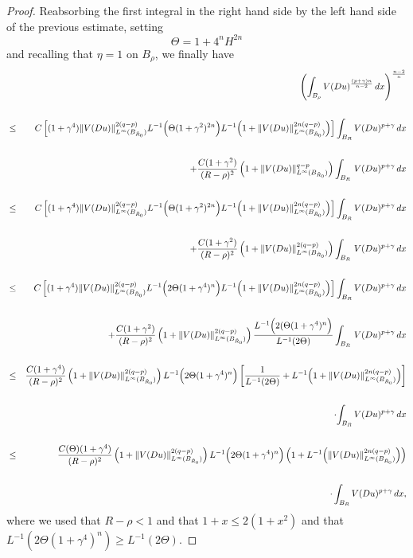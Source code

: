 \documentclass[12pt]{amsart}
\theoremstyle{definition}
\numberwithin{equation}{section}
\numberwithin{equation}{section}
\begin{document}
{\begin{proof}
Reabsorbing the first integral in the right hand side by the left hand side {of the previous estimate}, setting
$$\Theta= {1 + 4^nH^{2n}}$$
and recalling that $\eta=1$ on $B_\rho$, we finally have
\begin{eqnarray}\label{baseiter}
&&\left (\int_{B_{\rho}} V(Du)^{\frac{(p + \gamma) n}{n-2}} \,dx \right )^{\frac{n-2}{n}} \cr\cr
&\le& C\left[(1+\gamma^4) \|V(Du)\|_{L^\infty(B_{\tilde R_0})}^{2(q-p)} {{L}}^{-1} \Big(\Theta (1+\gamma^2)^{2n}\Big){{L}}^{-1} \Big(1+\|V(Du)\|^{2n(q-p)}_{L^\infty(B_{ \tilde R_0})}\Big) 
\right] \int_{B_R} V(Du)^{p + \gamma} \, dx\cr\cr
&&\qquad+\frac{C(1+\gamma^2)}{(R - \rho)^{2}}  \left(1 + \|V(Du)\|_{L^\infty(B_{\tilde R_0})}^{q-p} \right) \int_{B_{R}}  \,  V(Du)^{p + \gamma}  \, dx
\cr\cr
&\le& {C\left[(1+\gamma^4) \|V(Du)\|_{L^\infty(B_{\tilde R_0})}^{2(q-p)} {{L}}^{-1} \Big(\Theta (1+\gamma^2)^{2n}\Big){{L}}^{-1} \Big(1+\|V(Du)\|^{2n(q-p)}_{L^\infty(B_{ \tilde R_0})}\Big) 
\right] \int_{B_R} V(Du)^{p + \gamma} \, dx}\cr\cr
&&\qquad {+\frac{C(1+\gamma^2)}{(R - \rho)^{2}}  \left(1 + \|V(Du)\|_{L^\infty(B_{\tilde R_0})}^{2(q-p)} \right) \int_{B_{R}}  \,  V(Du)^{p + \gamma}  \, dx}
\cr\cr
&\le& {C\left[(1+\gamma^4) \|V(Du)\|_{L^\infty(B_{\tilde R_0})}^{2(q-p)} {{L}}^{-1} \Big({2} \Theta (1+\gamma^4)^{n}\Big){{L}}^{-1} \Big(1+\|V(Du)\|^{2n(q-p)}_{L^\infty(B_{ \tilde R_0})}\Big) 
\right] \int_{B_R} V(Du)^{p + \gamma} \, dx}\cr\cr
&&\qquad {+\frac{C(1+\gamma^2)}{(R - \rho)^{2}}  \left(1 + \|V(Du)\|_{L^\infty(B_{\tilde R_0})}^{2(q-p)} \right) \frac{L^{-1} \Big({2} (\Theta (1 + \gamma^4)^n \Big)}{L^{-1}({2} \Theta)}
\int_{B_{R}}  \,  V(Du)^{p + \gamma}  \, dx}
\cr\cr
&\le& 
{{\frac{C(1+\gamma^4)}{(R - \rho)^{2}}\left(1 + \|V(Du)\|_{L^\infty(B_{\tilde R_0})}^{2(q-p)} \right){{L}}^{-1} \Big({2}\Theta (1+\gamma^4)^n\Big) \left [\frac{1}{L^{-1}(2 \Theta)}+{{L}}^{-1} \Big(1+\|V(Du)\|^{2n(q-p)}_{L^\infty(B_{ \tilde R_0})}\Big)\right ]}}\cr\cr
&&\qquad\qquad\qquad\cdot {\int_{B_R} V(Du)^{p + \gamma} \, dx} \cr\cr
&\le& 
{\frac{{C(\Theta)}(1+\gamma^4)}{(R - \rho)^{2}}\left(1 + \|V(Du)\|_{L^\infty(B_{\tilde R_0})}^{2(q-p)} \right){{L}}^{-1} \Big({2}\Theta (1+\gamma^4)^n\Big) \left(1+{{L}}^{-1} \Big(\|V(Du)\|^{2n(q-p)}_{L^\infty(B_{ \tilde R_0})}\Big)\right)}\cr\cr
&&\qquad\qquad\qquad\qquad\qquad\cdot\int_{B_R} V(Du)^{p + \gamma} \, dx,
\end{eqnarray}
{where we used that $R-\rho<1$ and that $1+x\le 2(1+x^2)$ and that $L^{-1}({2}\Theta (1+\gamma^4)^n)\ge L^{-1}({2}\Theta)$.}%

\end{proof}}
\end{document}
